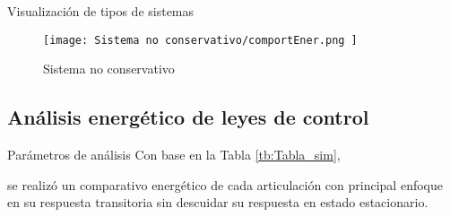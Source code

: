 \begin{frame}{Visualización de tipos de sistemas}
    \begin{figure}[H]
        \texttt{[image: Sistema no conservativo/comportEner.png ]}
        \centering
        \caption{ Sistema no conservativo }
        \label{fig:sistema_no_conservativo}
    \end{figure}
\end{frame}

\subsection{Análisis energético de leyes de control}
\begin{frame}{Parámetros de análisis}
    Con base en la Tabla \ref{tb:Tabla_sim},
    \begin{table}[H]%
        \centering
        \begin{center}
        \caption{Parámetros sistema conservativo} 
        \centering
        \end{center}
        \label{tb:Tabla_sim}
    \end{table}
    se realizó un comparativo energético de cada articulación con principal 
    enfoque en su respuesta transitoria sin descuidar su respuesta en estado estacionario. 
\end{frame}